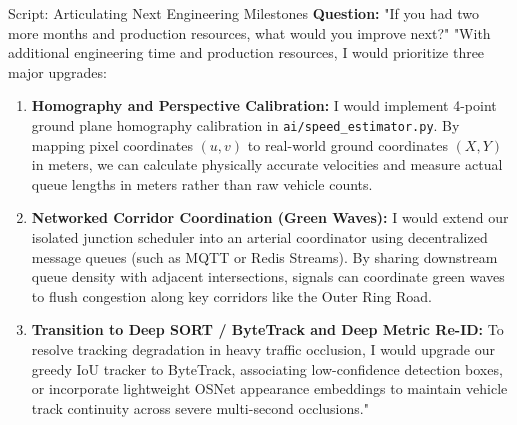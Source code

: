 \begin{interviewq}{Script: Articulating Next Engineering Milestones}
\textbf{Question:} "If you had two more months and production resources, what would you improve next?"
\tcblower
"With additional engineering time and production resources, I would prioritize three major upgrades:

\begin{enumerate}
    \item \textbf{Homography and Perspective Calibration:} I would implement 4-point ground plane homography calibration in \texttt{ai/speed\_estimator.py}. By mapping pixel coordinates $(u, v)$ to real-world ground coordinates $(X, Y)$ in meters, we can calculate physically accurate velocities and measure actual queue lengths in meters rather than raw vehicle counts.
    \item \textbf{Networked Corridor Coordination (Green Waves):} I would extend our isolated junction scheduler into an arterial coordinator using decentralized message queues (such as MQTT or Redis Streams). By sharing downstream queue density with adjacent intersections, signals can coordinate green waves to flush congestion along key corridors like the Outer Ring Road.
    \item \textbf{Transition to Deep SORT / ByteTrack and Deep Metric Re-ID:} To resolve tracking degradation in heavy traffic occlusion, I would upgrade our greedy IoU tracker to ByteTrack, associating low-confidence detection boxes, or incorporate lightweight OSNet appearance embeddings to maintain vehicle track continuity across severe multi-second occlusions."
\end{enumerate}
\end{interviewq}
